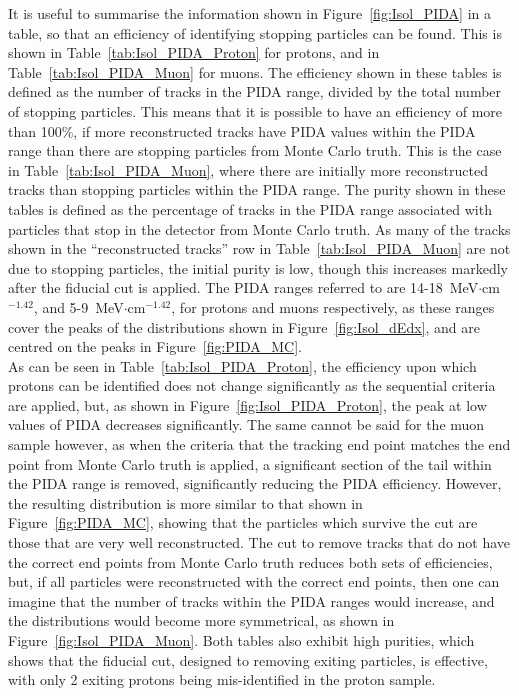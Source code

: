 
It is useful to summarise the information shown in Figure~\ref{fig:Isol_PIDA} in a table, so that an efficiency of identifying stopping particles can be found. This is shown in Table~\ref{tab:Isol_PIDA_Proton} for protons, and in Table~\ref{tab:Isol_PIDA_Muon} for muons. The efficiency shown in these tables is defined as the number of tracks in the PIDA range, divided by the total number of stopping particles. This means that it is possible to have an efficiency of more than 100\%, if more reconstructed tracks have PIDA values within the PIDA range than there are stopping particles from Monte Carlo truth. This is the case in Table~\ref{tab:Isol_PIDA_Muon}, where there are initially more reconstructed tracks than stopping particles within the PIDA range. The purity shown in these tables is defined as the percentage of tracks in the PIDA range associated with particles that stop in the detector from Monte Carlo truth. As many of the tracks shown in the ``reconstructed tracks'' row in Table~\ref{tab:Isol_PIDA_Muon} are not due to stopping particles, the initial purity is low, though this increases markedly after the fiducial cut is applied. The PIDA ranges referred to are 14-18~MeV$\cdot$cm$^{-1.42}$, and 5-9~MeV$\cdot$cm$^{-1.42}$, for protons and muons respectively, as these ranges cover the peaks of the distributions shown in Figure~\ref{fig:Isol_dEdx}, and are centred on the peaks in Figure~\ref{fig:PIDA_MC}. \\

As can be seen in Table~\ref{tab:Isol_PIDA_Proton}, the efficiency upon which protons can be identified does not change significantly as the sequential criteria are applied, but, as shown in Figure~\ref{fig:Isol_PIDA_Proton}, the peak at low values of PIDA decreases significantly. The same cannot be said for the muon sample however, as when the criteria that the tracking end point matches the end point from Monte Carlo truth is applied, a significant section of the tail within the PIDA range is removed, significantly reducing the PIDA efficiency. However, the resulting distribution is more similar to that shown in Figure~\ref{fig:PIDA_MC}, showing that the particles which survive the cut are those that are very well reconstructed. The cut to remove tracks that do not have the correct end points from Monte Carlo truth reduces both sets of efficiencies, but, if all particles were reconstructed with the correct end points, then one can imagine that the number of tracks within the PIDA ranges would increase, and the distributions would become more symmetrical, as shown in Figure~\ref{fig:Isol_PIDA_Muon}. Both tables also exhibit high purities, which shows that the fiducial cut, designed to removing exiting particles, is effective, with only 2 exiting protons being mis-identified in the proton sample. \\

